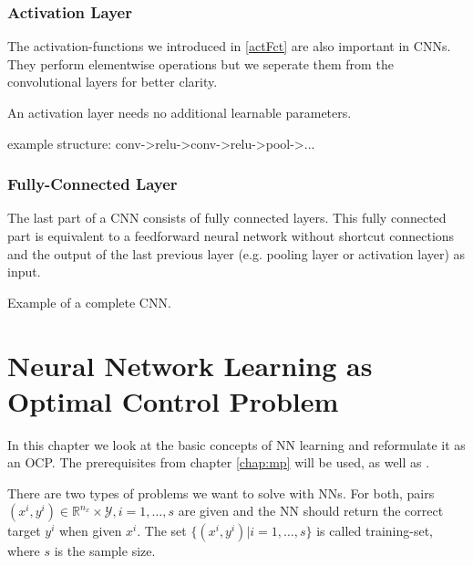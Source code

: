 \documentclass[a4paper, 12pt]{scrreprt} %
\begin{document}
\subsection{Activation Layer}
\label{subsec:AL}
The activation-functions we introduced in \ref{actFct} are also important in \acp{CNN}. They perform elementwise operations but we seperate them from the convolutional layers for better clarity.

An activation layer needs no additional learnable parameters.

example structure: conv->relu->conv->relu->pool->...

\subsection{Fully-Connected Layer}
\label{subsec:FCL}
The last part of a \ac{CNN} consists of fully connected layers. This fully connected part is equivalent to a feedforward neural network without shortcut connections and the output of the last previous layer (e.g. pooling layer or activation layer) as input. 

Example of a complete \ac{CNN}.



\chapter{Neural Network Learning as Optimal Control Problem}
\label{chap:NNLaOCP}
In this chapter we look at the basic concepts of \ac{NN} learning and reformulate it as an \ac{OCP}. The prerequisites from chapter \ref{chap:mp} will be used, as well as \cite{mlcba}. \newline

There are two types of problems we want to solve with \acp{NN}. For both, pairs $(x^i,y^i) \in \mathbb R^{n_x} \times \mathcal{Y}, i = 1,\dots,s$ are given and the \ac{NN} should return the correct target $y^i$ when given $x^i$. The set $\{(x^i,y^i)\vert i=1,\dots,s\}$ is called training-set, where $s$ is the sample size. 
\end{document}
